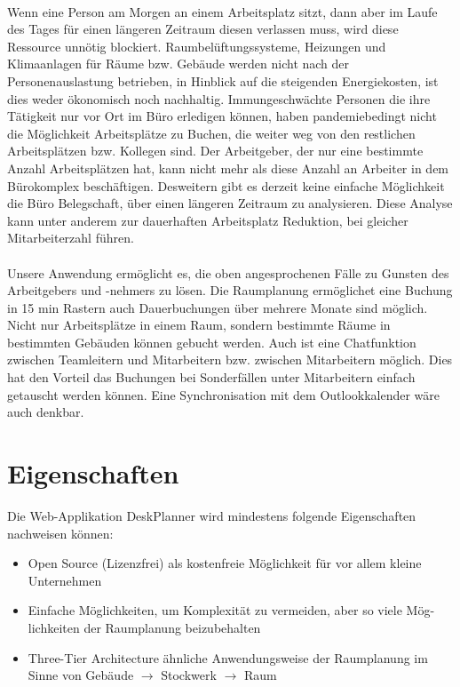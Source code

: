 \paragraph{} 
Wenn eine Person am Morgen an einem Arbeitsplatz sitzt, dann aber im Laufe des Tages für einen längeren Zeitraum diesen verlassen muss,
wird diese Ressource unnötig blockiert.
Raumbelüftungssysteme, Heizungen und Klimaanlagen für Räume bzw. Gebäude werden nicht nach der Personenauslastung betrieben, in Hinblick auf die steigenden Energiekosten, ist dies weder ökonomisch noch nachhaltig.
Immungeschwächte Personen die ihre Tätigkeit nur vor Ort im Büro erledigen können, haben pandemiebedingt nicht die Möglichkeit Arbeitsplätze zu Buchen, die weiter weg von den restlichen Arbeitsplätzen bzw. Kollegen sind. 
Der Arbeitgeber, der nur eine bestimmte Anzahl Arbeitsplätzen hat, kann nicht mehr als diese Anzahl an Arbeiter in dem Bürokomplex beschäftigen. 
Desweitern gibt es derzeit keine einfache Möglichkeit die Büro Belegschaft, über einen längeren Zeitraum zu analysieren. 
Diese Analyse kann unter anderem zur dauerhaften Arbeitsplatz Reduktion, bei gleicher Mitarbeiterzahl führen.

\paragraph{} Unsere Anwendung ermöglicht es, die oben angesprochenen Fälle zu Gunsten des Arbeitgebers und -nehmers zu lösen.
Die Raumplanung ermöglichet eine Buchung in 15 min Rastern auch Dauerbuchungen über mehrere Monate sind möglich.
Nicht nur Arbeitsplätze in einem Raum, sondern bestimmte Räume in bestimmten Gebäuden können gebucht werden.
Auch ist eine Chatfunktion zwischen Teamleitern und Mitarbeitern bzw. zwischen Mitarbeitern möglich.
Dies hat den Vorteil das Buchungen bei Sonderfällen unter Mitarbeitern einfach getauscht werden können.
Eine Synchronisation mit dem Outlookkalender wäre auch denkbar.

\section{Eigenschaften}
Die Web-Applikation DeskPlanner wird mindestens folgende Eigenschaften \\nachweisen können:

\begin{itemize}
    \item Open Source (Lizenzfrei) als kostenfreie Möglichkeit für vor allem kleine Unternehmen
    \item Einfache Möglichkeiten, um Komplexität zu vermeiden, aber so viele Mög-lichkeiten der Raumplanung beizubehalten
    \item Three-Tier Architecture ähnliche Anwendungsweise der Raumplanung im Sinne von Gebäude $\rightarrow$ Stockwerk $\rightarrow$ Raum 
\end{itemize}

